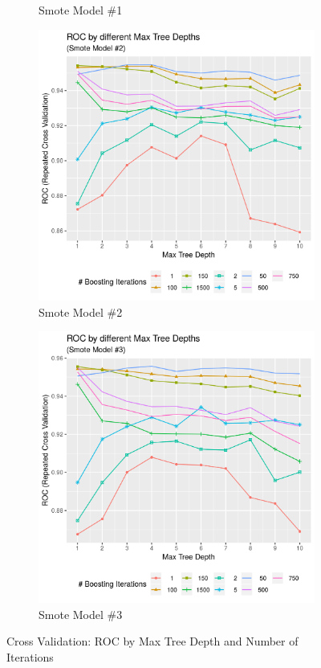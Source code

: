 \documentclass[12pt,a4paper]{article}
\begin{document}
\begin{appendices}
\begin{figure}[h!]
\begin{subfigure}{0.48\textwidth}
\caption{Smote Model \#1} \label{app:cv_graphics_roc_smote1}
\end{subfigure}
\begin{subfigure}{0.48\textwidth}
\includegraphics[width=\linewidth]{./graphics/cv/ROC_by_treeDepth_smote2.png}
\caption{Smote Model \#2} \label{app:cv_graphics_roc_smote2}
\end{subfigure}\hspace*{\fill}
\begin{subfigure}{0.48\textwidth}
\includegraphics[width=\linewidth]{./graphics/cv/ROC_by_treeDepth_smote3.png}
\caption{Smote Model \#3} \label{app:cv_graphics_roc_smote3}
\end{subfigure}
\caption{Cross Validation: ROC by Max Tree Depth and Number of Iterations} \label{fig:2}
\end{figure}
\pagebreak\clearpage

\end{appendices}
\end{document}
